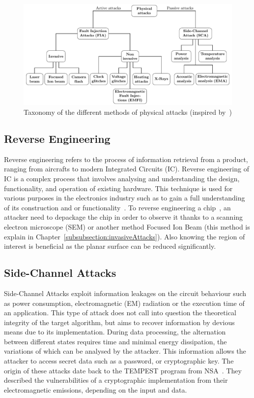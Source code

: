 \begin{figure}[ht]
    \centering
    \includegraphics[width=\textwidth, page=1]{c2_soa/img/physicalAttacks.pdf}
    \caption{Taxonomy of the different methods of physical attacks (inspired by~\cite{CKNDCTD-21-compsec})}
    \label{fig:arbo_fia}
\end{figure}

\subsection{Reverse Engineering}
Reverse engineering refers to the process of information retrieval from a product, ranging from aircrafts to modern Integrated Circuits (IC). Reverse engineering of IC is a complex process that involves analysing and understanding the design, functionality, and operation of existing hardware. This technique is used for various purposes in the electronics industry such as to gain a full understanding of its construction and or functionality~\cite{QCFASWCT-16-emergTech}.
To reverse engineering a chip~\cite{FSKWERP-17-ivsw}, an attacker need to depackage the chip in order to observe it thanks to a scanning electron microscope (SEM) or another method Focused Ion Beam (this method is explain in Chapter~\ref{subsubsection:invasiveAttacks}). Also knowing the region of interest is beneficial as the planar surface can be reduced significantly.

\subsection{Side-Channel Attacks}
Side-Channel Attacks exploit information leakages on the circuit behaviour such as power consumption, electromagnetic (EM) radiation or the execution time of an application.
This type of attack does not call into question the theoretical integrity of the target algorithm, but aims to recover information by devious means due to its implementation. During data processing, the alternation between different states requires time and minimal energy dissipation, the variations of which can be analysed by the attacker.
This information allows the attacker to access secret data such as a password, or cryptographic key. The origin of these attacks date back to the \mbox{TEMPEST} program from NSA~\cite{F-72-nsa}. They described the vulnerabilities of a cryptographic implementation from their electromagnetic emissions, depending on the input and data.

